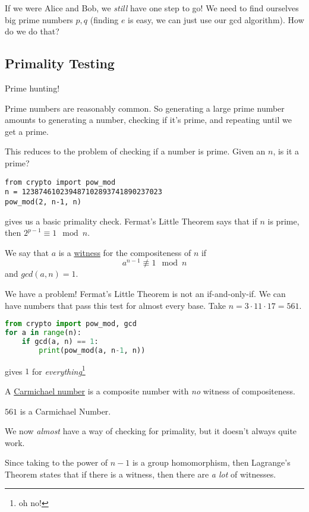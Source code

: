If we were Alice and Bob, we \emph{still} have one step to go! We need to find ourselves big prime numbers $p, q$ (finding $e$ is easy, we can just use our \textsf{gcd} algorithm). How do we do that?

\subsection{Primality Testing}
\textsf{Prime hunting!}

Prime numbers are reasonably common. So generating a large prime number amounts to generating a number, checking if it's prime, and repeating until we get a prime.

This reduces to the problem of checking if a number is prime. Given an $n$, is it a prime?

\begin{lstlisting}
from crypto import pow_mod
n = 123874610239487102893741890237023
pow_mod(2, n-1, n)
\end{lstlisting}
gives us a basic primality check. Fermat's Little Theorem says that if $n$ is prime, then $2^{p-1}\equiv 1\mod n$.

\begin{definition}[Witnesses]
    We say that $a$ is a \ul{witness} for the compositeness of $n$ if
    \[a^{n-1}\not\equiv 1\mod n\]
    and $gcd(a, n) = 1$.
\end{definition}

We have a problem! Fermat's Little Theorem is not an if-and-only-if. We can have numbers that pass this test for almost every base. Take $n = 3\cdot 11\cdot 17 = 561$.

\begin{lstlisting}[language=Python]
from crypto import pow_mod, gcd
for a in range(n):
    if gcd(a, n) == 1:
        print(pow_mod(a, n-1, n))
\end{lstlisting}
gives $1$ for \emph{everything}\footnote{oh no!}

\begin{definition}
    A \ul{Carmichael number} is a composite number with \emph{no} witness of compositeness.
\end{definition}
\begin{example}
    $561$ is a Carmichael Number.
\end{example}

We now \emph{almost} have a way of checking for primality, but it doesn't always quite work.

Since taking to the power of $n-1$ is a group homomorphism, then Lagrange's Theorem states that if there is a witness, then there are \emph{a lot} of witnesses.

